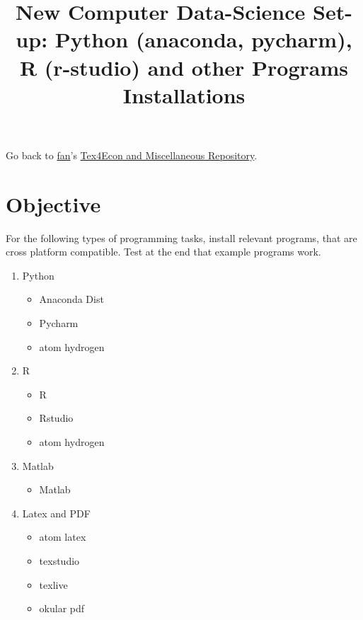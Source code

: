 \documentclass[]{article}
\title{New Computer Data-Science Set-up: Python (anaconda, pycharm), R
(r-studio) and other Programs Installations}
\author{}
\date{}
\providecommand{\tightlist}{%
  \setlength{\itemsep}{0pt}\setlength{\parskip}{0pt}}
\begin{document}
\maketitle

Go back to \href{http://fanwangecon.github.io/}{fan}'s
\href{http://fanwangecon.github.io/Tex4Econ/}{Tex4Econ and Miscellaneous
Repository}.

\hypertarget{objective}{%
\section{Objective}\label{objective}}

For the following types of programming tasks, install relevant programs,
that are cross platform compatible. Test at the end that example
programs work.

\begin{enumerate}
\def\labelenumi{\arabic{enumi}.}
\tightlist
\item
  Python

  \begin{itemize}
  \tightlist
  \item
    Anaconda Dist
  \item
    Pycharm
  \item
    atom hydrogen
  \end{itemize}
\item
  R

  \begin{itemize}
  \tightlist
  \item
    R
  \item
    Rstudio
  \item
    atom hydrogen
  \end{itemize}
\item
  Matlab

  \begin{itemize}
  \tightlist
  \item
    Matlab
  \end{itemize}
\item
  Latex and PDF

  \begin{itemize}
  \tightlist
  \item
    atom latex
  \item
    texstudio
  \item
    texlive
  \item
    okular pdf
  \end{itemize}
\end{enumerate}
\end{document}
